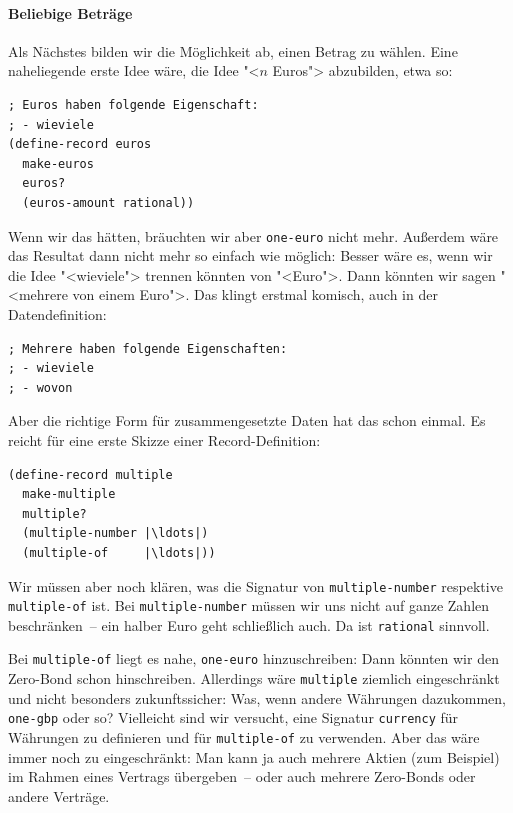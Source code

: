 \paragraph{Beliebige Beträge}
Als Nächstes bilden wir die Möglichkeit ab, einen Betrag zu wählen.
Eine naheliegende erste Idee wäre, die Idee "<$n$ Euros"> abzubilden,
etwa so:
%
\begin{lstlisting}
; Euros haben folgende Eigenschaft:
; - wieviele
(define-record euros
  make-euros
  euros?
  (euros-amount rational))
\end{lstlisting}
%
Wenn wir das hätten, bräuchten wir aber \lstinline{one-euro} nicht mehr.
Außerdem wäre das Resultat dann nicht mehr so einfach wie möglich:
Besser wäre es, wenn wir die Idee "<wieviele"> trennen könnten von
"<Euro">.  Dann könnten wir sagen "<mehrere von einem Euro">.  Das
klingt erstmal komisch, auch in der Datendefinition:
%
\begin{lstlisting}
; Mehrere haben folgende Eigenschaften:
; - wieviele
; - wovon
\end{lstlisting}
%
Aber die richtige Form für zusammengesetzte Daten hat das schon
einmal.  Es reicht für eine erste Skizze einer Record-Definition:
%
\begin{lstlisting}
(define-record multiple
  make-multiple
  multiple?
  (multiple-number |\ldots|)
  (multiple-of     |\ldots|))
\end{lstlisting}
%
Wir müssen aber noch klären, was die Signatur von
\lstinline{multiple-number} respektive \lstinline{multiple-of} ist.
Bei \lstinline{multiple-number} müssen wir uns nicht auf ganze Zahlen
beschränken~-- ein halber Euro geht schließlich auch.  Da ist
\lstinline{rational} sinnvoll.

Bei \lstinline{multiple-of} liegt es nahe, \lstinline{one-euro}
hinzuschreiben: Dann könnten wir den Zero-Bond schon hinschreiben.
Allerdings wäre \lstinline{multiple} ziemlich eingeschränkt und nicht
besonders zukunftssicher: Was, wenn andere Währungen dazukommen,
\lstinline{one-gbp} oder so?  Vielleicht sind wir versucht, eine
Signatur \lstinline{currency} für Währungen zu definieren und für
\lstinline{multiple-of} zu verwenden.  Aber das wäre immer noch zu
eingeschränkt: Man kann ja auch mehrere Aktien (zum Beispiel) im
Rahmen eines Vertrags übergeben~-- oder auch mehrere Zero-Bonds oder
andere Verträge.

